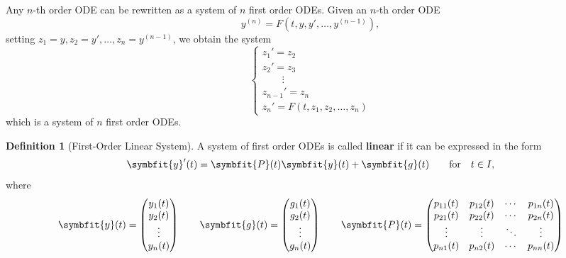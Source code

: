 \documentclass[10pt,UTF8]{article}
\newcommand{\mat}[1]{\symbfit{#1}}
\renewcommand{\vec}[1]{%
  \ifnum0\ifcat#1a1\else0\fi>0
  \symbfit{#1}  %
  \else
  \symbf{#1}  %
  \fi
}
\newenvironment{definitionBox}
{ \bigskip
  \begin{tcolorbox}[colback=blue!5!white,colframe=blue!75!black,parbox=false,before
  upper=\par,before lower=\par]}
  {
\end{tcolorbox}}
\theoremstyle{definition}
\newtheorem{definition inner}{Definition}[section]
\newenvironment{definition}[1][]
{
  \begin{definitionBox}
  \begin{definition inner}[#1]\hfill\par}
    {
    \end{definition inner}
\end{definitionBox}}
\theoremstyle{definition}
\newtheorem{theorem inner}{Theorem}[section]
\theoremstyle{definition}
\newtheorem*{proof inner}{\textit{Proof}}
\theoremstyle{plain}
\newtheorem{tip inner}{Tip}[section]
\theoremstyle{remark}
\begin{document}
Any \(n\)-th order ODE can be rewritten as a system of \(n\) first order ODEs.
Given an \(n\)-th order ODE
\begin{equation*}
  y^{(n)} = F(t, y, y', \ldots, y^{(n-1)}),
\end{equation*}
setting \(z_1 = y, z_2 = y', \ldots, z_n = y^{(n-1)}\), we obtain the system
\begin{equation*}
  \begin{cases}
    z_1' = z_2 \\
    z_2' = z_3 \\
    \qquad\vdots \\
    z_{n-1}' = z_n \\
    z_n' = F(t, z_1, z_2, \ldots, z_n)
  \end{cases}
\end{equation*}
which is a system of \(n\) first order ODEs.

\begin{definition}[First-Order Linear System]
  {}\label{def: 1st-order linear system}
  A system of first order ODEs is called \textbf{linear} if it can be
  expressed in the form
  \begin{equation}
    \vec{y}'(t) = \mat{P}(t) \vec{y}(t) + \vec{g}(t) \quad \qfor t\in I,
    \label{eq: 1st-order linear system}
  \end{equation}
  where
  \begin{equation*}
    \vec{y}(t) =
    \begin{pmatrix}
      y_1(t) \\
      y_2(t) \\
      \vdots \\
      y_n(t)
    \end{pmatrix}
    \qquad
    \vec{g}(t) =
    \begin{pmatrix}
      g_1(t) \\
      g_2(t) \\
      \vdots \\
      g_n(t)
    \end{pmatrix}
    \qquad
    \mat{P}(t) =
    \begin{pmatrix}
      p_{11}(t) & p_{12}(t) & \cdots & p_{1n}(t) \\
      p_{21}(t) & p_{22}(t) & \cdots & p_{2n}(t) \\
      \vdots & \vdots & \ddots & \vdots \\
      p_{n1}(t) & p_{n2}(t) & \cdots & p_{nn}(t)
    \end{pmatrix}
  \end{equation*}
\end{definition}
\end{document}
